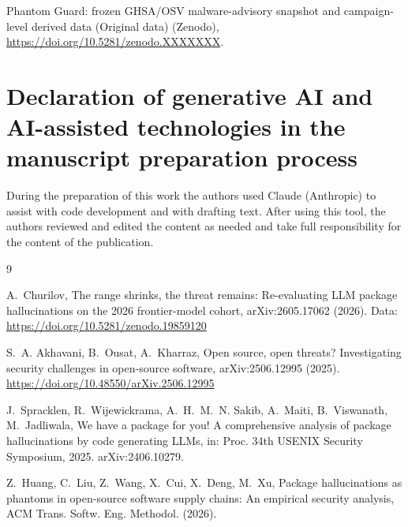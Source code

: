 \documentclass[preprint,12pt]{elsarticle}
\begin{document}
Phantom Guard: frozen GHSA/OSV malware-advisory snapshot and campaign-level derived data (Original data) (Zenodo), \url{https://doi.org/10.5281/zenodo.XXXXXXX}. %

\section*{Declaration of generative AI and AI-assisted technologies in the manuscript preparation process}

During the preparation of this work the authors used Claude (Anthropic) to assist with code development and with drafting text. After using this tool, the authors reviewed and edited the content as needed and take full responsibility for the content of the publication.

\begin{thebibliography}{9}

A.~Churilov, The range shrinks, the threat remains: Re-evaluating LLM package hallucinations on the 2026 frontier-model cohort, arXiv:2605.17062 (2026). Data: \url{https://doi.org/10.5281/zenodo.19859120}

S.~A. Akhavani, B.~Ousat, A.~Kharraz, Open source, open threats? Investigating security challenges in open-source software, arXiv:2506.12995 (2025). \url{https://doi.org/10.48550/arXiv.2506.12995}

J.~Spracklen, R.~Wijewickrama, A.~H.~M.~N. Sakib, A.~Maiti, B.~Viswanath, M.~Jadliwala, We have a package for you! A comprehensive analysis of package hallucinations by code generating LLMs, in: Proc. 34th USENIX Security Symposium, 2025. arXiv:2406.10279.

Z.~Huang, C.~Liu, Z.~Wang, X.~Cui, X.~Deng, M.~Xu, Package hallucinations as phantoms in open-source software supply chains: An empirical security analysis, ACM Trans. Softw. Eng. Methodol. (2026). %

\end{thebibliography}
\end{document}
